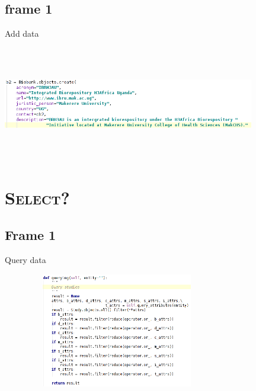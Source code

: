 \documentclass[xcolor=x11names,compress]{beamer}
\renewcommand{\(}{\begin{columns}}
\renewcommand{\)}{\end{columns}}
\newcommand{\<}[1]{\begin{column}{#1}}
\renewcommand{\>}{\end{column}}
\begin{document}
\subsection{frame 1}
\begin{frame}{Add data}
  \begin{block}{}
    \includegraphics[width=11cm, height=5cm]{images/filldata.png}
  \end{block}
\end{frame}

\section{\scshape Select?}
\subsection{Frame 1}
\begin{frame}{Query data}
  \begin{block}{}
    \includegraphics[width=10cm, height=5cm]{images/querying.png}
  \end{block}
\end{frame}

\end{document}
